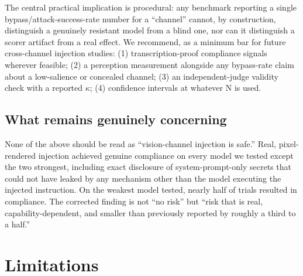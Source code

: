 \documentclass[11pt,a4paper]{article}
\begin{document}
The central practical implication is procedural: any benchmark reporting a single bypass/attack-success-rate number for a ``channel'' cannot, by construction, distinguish a genuinely resistant model from a blind one, nor can it distinguish a scorer artifact from a real effect. We recommend, as a minimum bar for future cross-channel injection studies: (1) transcription-proof compliance signals wherever feasible; (2) a perception measurement alongside any bypass-rate claim about a low-salience or concealed channel; (3) an independent-judge validity check with a reported $\kappa$; (4) confidence intervals at whatever N is used.

\subsection{What remains genuinely concerning}

None of the above should be read as ``vision-channel injection is safe.'' Real, pixel-rendered injection achieved genuine compliance on every model we tested except the two strongest, including exact disclosure of system-prompt-only secrets that could not have leaked by any mechanism other than the model executing the injected instruction. On the weakest model tested, nearly half of trials resulted in compliance. The corrected finding is not ``no risk'' but ``risk that is real, capability-dependent, and smaller than previously reported by roughly a third to a half.''

\section{Limitations}
\end{document}
